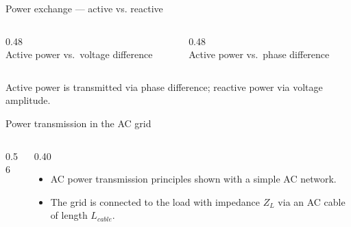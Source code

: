 \begin{frame}{Power exchange --- active vs. reactive}
  \begin{columns}[c,onlytextwidth]
    \begin{column}{0.48\textwidth}\centering
      \\[0.3em]
      {\footnotesize Active power vs.\ voltage difference}
    \end{column}
    \begin{column}{0.48\textwidth}\centering
      \\[0.3em]
      {\footnotesize Active power vs.\ phase difference}
    \end{column}
  \end{columns}
  \vspace{0.3em}
  {\color{atGray}\footnotesize Active power is transmitted via phase difference; reactive power via voltage amplitude.}
\end{frame}

\begin{frame}{Power transmission in the AC grid}
  \begin{columns}[c,onlytextwidth]
    \begin{column}{0.56\textwidth}\centering
    \end{column}
    \begin{column}{0.40\textwidth}
      \begin{itemize}
        \setlength{\itemsep}{0.4em}
        \item AC power transmission principles shown with a simple AC network.
        \item The grid is connected to the load with impedance $Z_L$ via an
              AC cable of length $L_{cable}$.
      \end{itemize}
    \end{column}
  \end{columns}
\end{frame}

